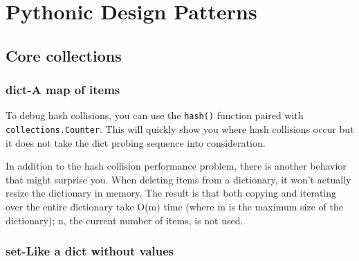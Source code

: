 \chapter{Pythonic Design Patterns\label{Ch04}}
\section{Core collections}
\subsection{dict-A map of items}
\begin{tcolorbox}
    To debug hash collisions, you can use the \verb|hash()| function paired with \verb|collections.Counter|. This will quickly show you where hash collisions occur but it does not take the dict probing sequence into consideration.
\end{tcolorbox}

In addition to the hash collision performance problem, there is another behavior that might surprise you. When deleting items from a dictionary, it won’t actually resize the dictionary in memory. The result is that both copying and iterating over the entire dictionary take O(m) time (where m is the maximum size of the dictionary); n, the current number of items, is not used.

\subsection{set-Like a dict without values}